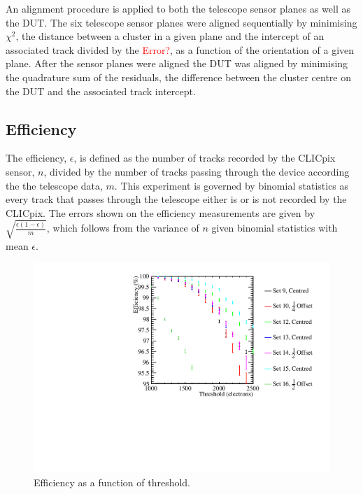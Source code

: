 An alignment procedure is applied to both the telescope sensor planes as well as the DUT.  The six telescope sensor planes were aligned sequentially by minimising $\chi^{2}$, the distance between a cluster in a given plane and the intercept of an associated track divided by the \textcolor{red}{Error?}, as a function of the orientation of a given plane.  After the sensor planes were aligned the DUT was aligned by minimising the quadrature sum of the residuals, the difference between the cluster centre on the DUT and the associated track intercept.  


\subsection{Efficiency}
The efficiency, $\epsilon$, is defined as the number of tracks recorded by the CLICpix sensor, $n$, divided by the number of tracks passing through the device according the the telescope data, $m$.  This experiment is governed by binomial statistics as every track that passes through the telescope either is or is not recorded by the CLICpix.  The errors shown on the efficiency measurements are given by $\sqrt{\frac{\epsilon (1 - \epsilon)}{m}}$, which follows from the variance of $n$ given binomial statistics with mean $\epsilon$.  

\begin{figure}
\centering
\includegraphics[width=1.0\textwidth]{CLICdpVertex/Plots/TestBeamData/EfficiencyThresholdPlot.pdf}
\caption[Efficiency as a function of threshold.]{Efficiency as a function of threshold.}
\label{fig:efficiency}
\end{figure}

